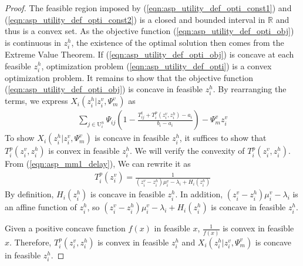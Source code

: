 \documentclass[conference]{IEEEtran}
\begin{document}
\begin{proof}
The feasible region imposed by (\ref{eqn:asp_utility_def_opti_const1}) and (\ref{eqn:asp_utility_def_opti_const2}) is a closed and bounded interval in $\mathbb{R}$ and thus is a convex set. As the objective function (\ref{eqn:asp_utility_def_opti_obj}) is continuous in $z_i^h$, the existence of the optimal solution then comes from the Extreme Value Theorem. If (\ref{eqn:asp_utility_def_opti_obj}) is concave at each feasible $z_i^h$, optimization problem (\ref{eqn:asp_utility_def_opti}) is a convex optimization problem. It remains to show that the objective function (\ref{eqn:asp_utility_def_opti_obj}) is concave in feasible $z_i^h$. By rearranging the terms, we express $X_i(z_i^h|z_i^v,\Psi_m^v)$ as
\begin{equation}
\begin{aligned}
    \sum_{j \in \mathrm{U}_i^{n}}\Psi_{ij}(1-\frac{T_{ij}^t+T_i^p(z_i^v, z_i^h)-a_i}{b_i-a_i})- \Psi_m^v z_i^v 
\end{aligned}
\end{equation}
To show $X_i(z_i^h|z_i^v,\Psi_m^v)$ is concave in feasible $z_i^h$, it suffices to show that $T_i^p(z_i^v, z_i^h)$ is convex in feasible $z_i^h$. We will verify the convexity of $T_i^p(z_i^v, z_i^h)$. From (\ref{eqn:asp_mm1_delay}), We can rewrite it as
\begin{equation} 
\begin{aligned}
T_i^p(z_i^v)=\frac{1}{(z_i^v-z_i^h)\mu_i^v - \lambda_i + H_i(z_i^h)}
\end{aligned}
\end{equation}
By definition, $H_i(z_i^h)$ is concave in feasible $z_i^h$. In addition, $(z_i^v-z_i^h)\mu_i^v - \lambda_i$ is an affine function of $z_i^h$, so $(z_i^v-z_i^h)\mu_i^v - \lambda_i + H_i(z_i^h)$ is concave in feasible $z_i^h$.

Given a positive concave function $f(x)$ in feasible $x$, $\frac{1}{f(x)}$ is convex in feasible $x$\cite[Chapter~3.2]{boyd2004convex}. Therefore, $T_i^p(z_i^v, z_i^h)$ is convex in feasible $z_i^h$ and $X_i(z_i^h|z_i^v,\Psi_m^v)$ is concave in feasible $z_i^h$.
\end{proof}
\end{document}
